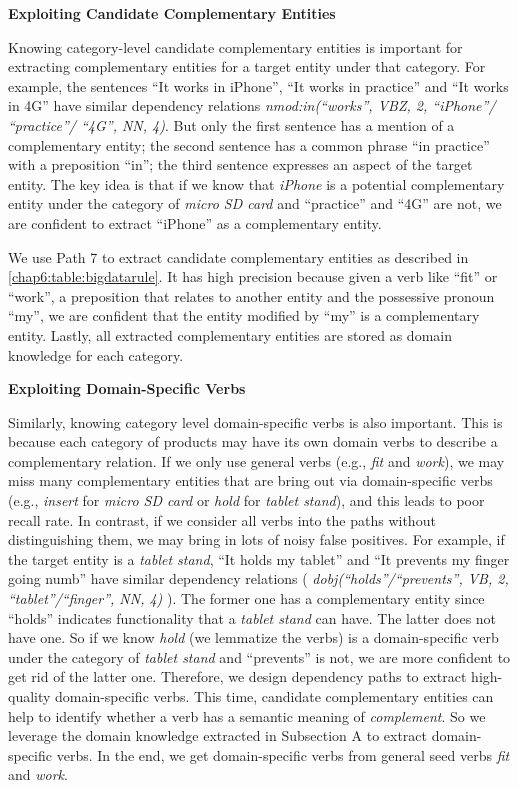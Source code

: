 \textbf{Exploiting Candidate Complementary Entities}

Knowing category-level candidate complementary entities is important for extracting complementary entities for a target entity under that category. For example, the sentences ``It works in iPhone'', ``It works in practice'' and ``It works in 4G'' have similar dependency relations \textit{nmod:in(``works'', VBZ, 2, ``iPhone''/ ``practice''/ ``4G'', NN, 4)}. But only the first sentence has a mention of a complementary entity; the second sentence has a common phrase ``in practice'' with a preposition ``in''; the third sentence expresses an aspect of the target entity. The key idea is that if we know that \textit{iPhone} is a potential complementary entity under the category of \textit{micro SD card} and ``practice'' and ``4G'' are not, we are confident to extract ``iPhone'' as a complementary entity.

We use Path 7 to extract candidate complementary entities as described in \ref{chap6:table:bigdatarule}. It has high precision because given a verb like ``fit'' or ``work'', a preposition that relates to another entity and the possessive pronoun ``my'', we are confident that the entity modified by ``my'' is a complementary entity. Lastly, all extracted complementary entities are stored as domain knowledge for each category. 

\textbf{Exploiting Domain-Specific Verbs}

Similarly, knowing category level domain-specific verbs is also important. This is because each category of products may have its own domain verbs to describe a complementary relation. If we only use general verbs (e.g., \textit{fit} and \textit{work}), we may miss many complementary entities that are bring out via domain-specific verbs (e.g., \textit{insert} for \textit{micro SD card} or \textit{hold} for \textit{tablet stand}), and this leads to poor recall rate. In contrast, if we consider all verbs into the paths without distinguishing them, we may bring in lots of noisy false positives. For example, if the target entity is a \textit{tablet stand}, ``It holds my tablet'' and ``It prevents my finger going numb'' have similar dependency relations ( \textit{dobj(``holds''/``prevents'', VB, 2, ``tablet''/``finger'', NN, 4)} ). The former one has a complementary entity since ``holds'' indicates functionality that a \textit{tablet stand} can have. The latter does not have one. So if we know \textit{hold} (we lemmatize the verbs) is a domain-specific verb under the category of \textit{tablet stand} and ``prevents'' is not, we are more confident to get rid of the latter one. Therefore, we design dependency paths to extract high-quality domain-specific verbs. This time, candidate complementary entities can help to identify whether a verb has a semantic meaning of \textit{complement}. So we leverage the domain knowledge extracted in Subsection A to extract domain-specific verbs. In the end, we get domain-specific verbs from general seed verbs \textit{fit} and \textit{work}.

